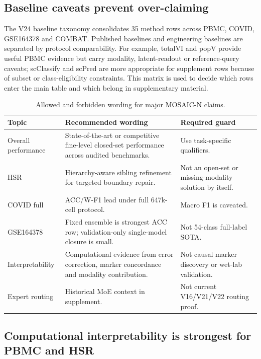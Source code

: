\documentclass[unnumsec,webpdf,contemporary,large,numbered]{oup-authoring-template}
\begin{document}
\subsection{Baseline caveats prevent over-claiming}

The V24 baseline taxonomy consolidates 35 method rows across PBMC, COVID, GSE164378 and COMBAT. Published baselines and engineering baselines are separated by protocol comparability. For example, totalVI and popV provide useful PBMC evidence but carry modality, latent-readout or reference-query caveats; scClassify and scPred are more appropriate for supplement rows because of subset or class-eligibility constraints. This matrix is used to decide which rows enter the main table and which belong in supplementary material.

\begin{table}[t]
\centering
\caption{Allowed and forbidden wording for major MOSAIC-N claims.}
\label{tab:wording}
\small
\begin{tabular}{p{3.0cm}p{7.0cm}p{5.0cm}}
\toprule
Topic & Recommended wording & Required guard \\
\midrule
Overall performance & State-of-the-art or competitive fine-level closed-set performance across audited benchmarks. & Use task-specific qualifiers. \\
HSR & Hierarchy-aware sibling refinement for targeted boundary repair. & Not an open-set or missing-modality solution by itself. \\
COVID full & ACC/W-F1 lead under full 647k-cell protocol. & Macro F1 is caveated. \\
GSE164378 & Fixed ensemble is strongest ACC row; validation-only single-model closure is small. & Not 54-class full-label SOTA. \\
Interpretability & Computational evidence from error correction, marker concordance and modality contribution. & Not causal marker discovery or wet-lab validation. \\
Expert routing & Historical MoE context in supplement. & Not current V16/V21/V22 routing proof. \\
\bottomrule
\end{tabular}
\end{table}

\subsection{Computational interpretability is strongest for PBMC and HSR}
\end{document}
